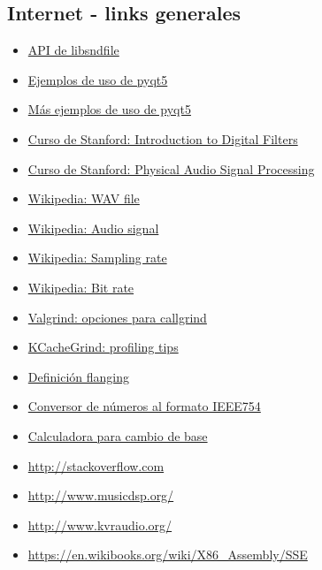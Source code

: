 \subsection{Internet - links generales}
\begin{itemize}
\item \href{http://www.mega-nerd.com/libsndfile/api.html}{API de libsndfile}
\item \href{http://zetcode.com/gui/pyqt5/}{Ejemplos de uso de pyqt5}
\item \href{https://github.com/shuge/Qt-Python-Binding-Examples}{Más ejemplos de uso de pyqt5}
\item \href{https://ccrma.stanford.edu/~jos/}{Curso de Stanford: Introduction to Digital Filters}
\item \href{https://ccrma.stanford.edu/~jos/pasp/}{Curso de Stanford: Physical Audio Signal Processing}
\item \href{https://en.wikipedia.org/wiki/WAV}{Wikipedia: WAV file}
\item \href{https://en.wikipedia.org/wiki/Audio_signal}{Wikipedia: Audio signal}
\item \href{http://en.wikipedia.org/wiki/Sampling_rate}{Wikipedia: Sampling rate}
\item \href{https://en.wikipedia.org/wiki/Bit_rate}{Wikipedia: Bit rate}
\item \href{http://valgrind.org/docs/manual/cl-manual.html}{Valgrind: opciones para callgrind}
\item \href{http://kcachegrind.sourceforge.net/html/Tips.html}{KCacheGrind: profiling tips}
\item \href{http://whatis.techtarget.com/definition/flanging}{Definición flanging}
\item \href{http://www.h-schmidt.net/FloatConverter/IEEE754.html}{Conversor de números al formato IEEE754}
\item \href{http://www.cleavebooks.co.uk/scol/calnumba.htm}{Calculadora para cambio de base}
\item \url{http://stackoverflow.com}
\item \url{http://www.musicdsp.org/}
\item \url{http://www.kvraudio.org/}
\item \url{https://en.wikibooks.org/wiki/X86_Assembly/SSE}
\end{itemize}

